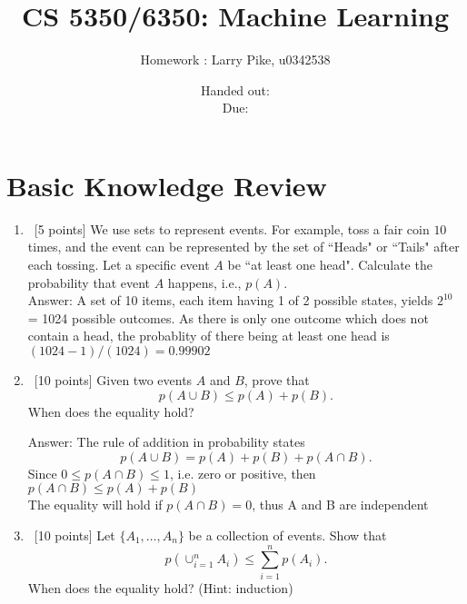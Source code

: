 \documentclass[12pt, fullpage,letterpaper]{article}
\title{CS 5350/6350: Machine Learning \semester}
\author{Homework \assignmentId:   Larry Pike, u0342538}
\date{Handed out: \releaseDate\\
  Due: \dueDate}
\begin{document}
\maketitle






\section*{Basic Knowledge Review}
\label{sec:q1}
\begin{enumerate}
\item~[5 points] We use sets to represent events. For example, toss a fair coin $10$ times, and the event can be represented by the set of ``Heads" or ``Tails" after each tossing. Let a specific event $A$ be ``at least one head". Calculate the probability that event $A$ happens, i.e., $p(A)$.\\

Answer: 
A set of 10 items, each item having 1 of 2 possible states, yields   ${ 2^{10} }$ = 1024 possible outcomes.  As there is only one outcome which does not contain a head, the probablity of there being at least one head is ${  (1024-1)/(1024) =  0.99902 }$


\item~[10 points] Given two events $A$ and $B$, prove that 
\[ p(A \cup B) \le p(A) + p(B). \]
When does the equality hold?

Answer: 
The rule of addition in probability states\\
\[ p(A \cup B) = p(A) + p(B) +p( A \cap B)     . \]
Since ${ 0 \le p( A \cap B) \le 1 }$, i.e. zero or positive, then \\ ${ p(A \cap B) \le p(A) + p(B)  }$\\

The equality will hold if ${ p(A \cap B) = 0   }$, thus A and B are independent

\item~[10 points] Let $\{A_1, \ldots, A_n\}$ be a collection of events. Show that
\[
p(\cup_{i=1}^n A_i) \le \sum_{i=1}^n p(A_i).
\]
When does the equality hold? (Hint: induction)



\end{enumerate}
\end{document}
